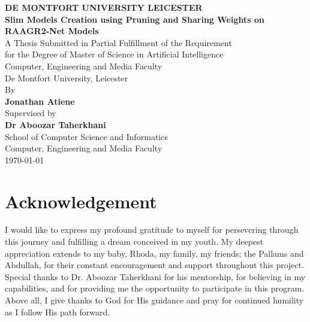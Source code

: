 \documentclass[12pt,a4paper]{article}
\begin{document}
\thispagestyle{empty}

\begin{center}
    \vspace*{1cm}
    {\large\textbf{DE MONTFORT UNIVERSITY LEICESTER}}\\[2cm]
    
    {\LARGE\textbf{Slim Models Creation using Pruning and Sharing Weights on RAAGR2-Net Models}}\\[2cm]
    
    {\large A Thesis Submitted in Partial Fulfillment of the Requirement\\
    for the Degree of Master of Science in Artificial Intelligence}\\[1cm]
    
    {\large Computer, Engineering and Media Faculty}\\[0.3cm]
    
    {\large De Montfort University, Leicester}\\[3cm]
    
    {\large By}\\[0.5cm]
    
    {\large\textbf{Jonathan Atiene}}\\[1.5cm]
    
    {\large Supervised by}\\[0.5cm]
    
    {\large\textbf{Dr Aboozar Taherkhani}}\\[0.5cm]
    
    {\large School of Computer Science and Informatics}\\[0.3cm]
    
    {\large Computer, Engineering and Media Faculty}\\[1cm]
    
    {\large\today}
\end{center}

\newpage

\section*{Acknowledgement}
I would like to express my profound gratitude to myself for persevering through this journey and fulfilling a dream conceived in my youth. My deepest appreciation extends to my baby, Rhoda, my family, my friends; the Pallams and Abdullah, for their constant encouragement and support throughout this project. Special thanks to Dr. Aboozar Taherkhani for his mentorship, for believing in my capabilities, and for providing me the opportunity to participate in this program. Above all, I give thanks to God for His guidance and pray for continued humility as I follow His path forward.
\end{document}
